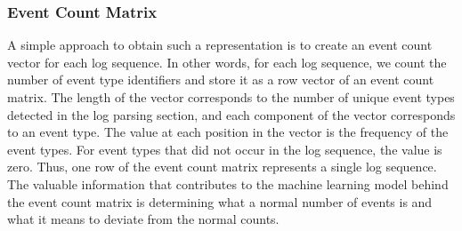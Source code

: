 \begin{figure}[!h] 
\end{figure}

\begin{table}
\centering
{}
\caption{A summary of feature matrix types using in our thesis.}\label{tab:embeddings-summary}
\end{table}

\subsubsection*{Event Count Matrix}
A simple approach to obtain such a representation is to create an event count vector for each log sequence. In other words, for each log sequence, we count the number of event type identifiers and store it as a row vector of an event count matrix. The length of the vector corresponds to the number of unique event types detected in the log parsing section, and each component of the vector corresponds to an event type. The value at each position in the vector is the frequency of the event types. For event types that did not occur in the log sequence, the value is zero. Thus, one row of the event count matrix represents a single log sequence. The valuable information that contributes to the machine learning model behind the event count matrix is determining what a normal number of events is and what it means to deviate from the normal counts.


